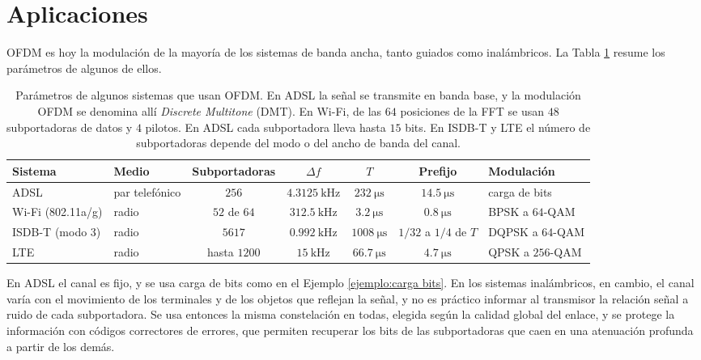 \section{Aplicaciones}\label{sec:ofdm aplicaciones}

OFDM es hoy la modulación de la mayoría de los sistemas de banda ancha, tanto guiados como inalámbricos. La Tabla \ref{tab:ofdm sistemas} resume los parámetros de algunos de ellos.

\begin{table}
    \begin{center}
    \footnotesize
    \begin{tabular}{l|l|c|c|c|c|l}
        Sistema & Medio & Subportadoras & $\Delta f$ & $T$ & Prefijo & Modulación \\ \hline
        ADSL & par telefónico & $256$ & $4.3125\ \unit{\kilo\hertz}$ & $232\ \unit{\micro\second}$ & $14.5\ \unit{\micro\second}$ & carga de bits \\
        Wi-Fi (802.11a/g) & radio & $52$ de $64$ & $312.5\ \unit{\kilo\hertz}$ & $3.2\ \unit{\micro\second}$ & $0.8\ \unit{\micro\second}$ & BPSK a $64$-QAM \\
        ISDB-T (modo 3) & radio & $5617$ & $0.992\ \unit{\kilo\hertz}$ & $1008\ \unit{\micro\second}$ & $1/32$ a $1/4$ de $T$ & DQPSK a $64$-QAM \\
        LTE & radio & hasta $1200$ & $15\ \unit{\kilo\hertz}$ & $66.7\ \unit{\micro\second}$ & $4.7\ \unit{\micro\second}$ & QPSK a $256$-QAM
    \end{tabular}
    \end{center}
    \caption{Parámetros de algunos sistemas que usan OFDM. En ADSL la señal se transmite en banda base, y la modulación OFDM se denomina allí \emph{Discrete Multitone} (DMT). En Wi-Fi, de las $64$ posiciones de la FFT se usan $48$ subportadoras de datos y $4$ pilotos. En ADSL cada subportadora lleva hasta $15$ bits. En ISDB-T y LTE el número de subportadoras depende del modo o del ancho de banda del canal.}\label{tab:ofdm sistemas}
\end{table}

En ADSL el canal es fijo, y se usa carga de bits como en el Ejemplo \ref{ejemplo:carga bits}. En los sistemas inalámbricos, en cambio, el canal varía con el movimiento de los terminales y de los objetos que reflejan la señal, y no es práctico informar al transmisor la relación señal a ruido de cada subportadora. Se usa entonces la misma constelación en todas, elegida según la calidad global del enlace, y se protege la información con códigos correctores de errores, que permiten recuperar los bits de las subportadoras que caen en una atenuación profunda a partir de los demás.

